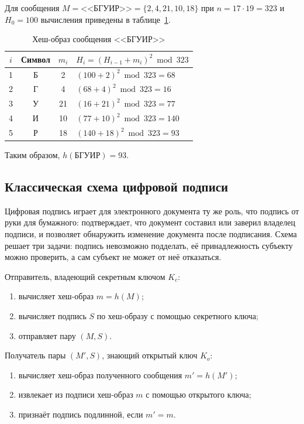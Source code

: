 \documentclass[14pt,a4paper]{extarticle}
\begin{document}
Для сообщения $M = \text{<<БГУИР>>} = \{2, 4, 21, 10, 18\}$ при $n = 17 \cdot 19 = 323$
и $H_0 = 100$ вычисления приведены в таблице~\ref{tab:hash}.

\begin{table}[H]
\caption{Хеш-образ сообщения <<БГУИР>>}
\label{tab:hash}
\centering
\begin{tabular}{cccl}
\toprule
$i$ & Символ & $m_i$ & $H_i = (H_{i-1} + m_i)^2 \bmod 323$ \\
\midrule
1 & Б & 2 & $(100 + 2)^2 \bmod 323 = 68$ \\
2 & Г & 4 & $(68 + 4)^2 \bmod 323 = 16$ \\
3 & У & 21 & $(16 + 21)^2 \bmod 323 = 77$ \\
4 & И & 10 & $(77 + 10)^2 \bmod 323 = 140$ \\
5 & Р & 18 & $(140 + 18)^2 \bmod 323 = 93$ \\
\bottomrule
\end{tabular}
\end{table}

Таким образом, $h(\text{БГУИР}) = 93$.

\subsection{Классическая схема цифровой подписи}

Цифровая подпись играет для электронного документа ту же роль, что подпись от руки
для бумажного: подтверждает, что документ составил или заверил владелец подписи, и
позволяет обнаружить изменение документа после подписания. Схема решает три задачи:
подпись невозможно подделать, её принадлежность субъекту можно проверить, а сам
субъект не может от неё отказаться.

Отправитель, владеющий секретным ключом $K_c$:
\begin{enumerate}
\item вычисляет хеш-образ $m = h(M)$;
\item вычисляет подпись $S$ по хеш-образу с помощью секретного ключа;
\item отправляет пару $(M, S)$.
\end{enumerate}

Получатель пары $(M', S)$, знающий открытый ключ $K_o$:
\begin{enumerate}
\item вычисляет хеш-образ полученного сообщения $m' = h(M')$;
\item извлекает из подписи хеш-образ $m$ с помощью открытого ключа;
\item признаёт подпись подлинной, если $m' = m$.
\end{enumerate}
\end{document}
